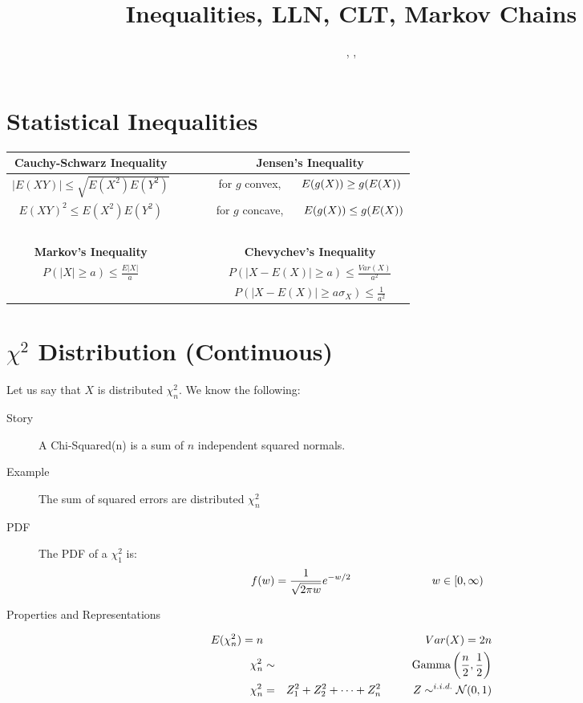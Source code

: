 \documentclass[11.5pt]{article}
\title{Inequalities, LLN, CLT, Markov Chains}
\author{\shira, \tim, \creds}
\begin{document}
\maketitle

\begin{notes}

\section*{Statistical Inequalities}

\begin{table}[htb!]
   \centering
   \setlength{\extrarowheight}{3pt}
	\begin{tabular}{cccc}
	\textbf{Cauchy-Schwarz Inequality} & ~ & ~ & \textbf{Jensen's Inequality} \\
	\midrule
	$|E(XY)| \leq \sqrt{E(X^2)E(Y^2)}$ & ~ & ~ & for $g$ convex, $\hspace{.5 cm} E(g(X)) \geq g(E(X))$ \\
	$E(XY)^2 \leq E\left(X^2\right)E\left(Y^2\right)$ & ~ & ~ & for $g$ concave, $\hspace{.5 cm} E(g(X)) \leq g(E(X))$ \\
	~ & ~ & ~ & ~ \\
	\textbf{Markov's Inequality} & ~ & ~ & \textbf{Chevychev's Inequality} \\
	\midrule
	$P(|X| \geq a) \leq \frac{E|X|}{a}$ & ~ & ~ & $P(|X - E(X)| \geq a) \leq \frac{Var(X)}{a^2}$ \\
	~ & ~ & ~ & $P(|X - E(X)| \geq a\sigma_X) \leq \frac{1}{a^2}$ \\
	\end{tabular}
\end{table}

\section*{$\chi^2$ Distribution (Continuous)}
Let us say that $X$ is distributed $\chi^2_n$. We know the following:
\begin{description}
	\item[Story] A Chi-Squared(n) is a sum of $n$ independent squared normals.
	\item[Example]	The sum of squared errors are distributed $\chi^2_n$
	\item[PDF] The PDF of a $\chi^2_1$ is:
\begin{eqnarray*}
f(w) = \frac{1}{\sqrt{2\pi w}}e^{-w/2}
\hspace{1 in}
w \in [0, \infty)
\end{eqnarray*}
	\item[Properties and Representations]
\end{description}
\vspace{-.4 cm}
	\begin{eqnarray*}
		E(\chi^2_n) = n && Var(X) = 2n \\
		\chi_n^2 &\sim& \textrm{Gamma}\left(\frac{n}{2}, \frac{1}{2}\right) \\
		\chi_n^2 &=& Z_1^2 + Z_2^2 + \dots + Z_n^2 \hspace{1 cm} Z \sim^{i.i.d.} \mathcal{N}(0, 1)
	\end{eqnarray*}


\end{notes}
\end{document}
